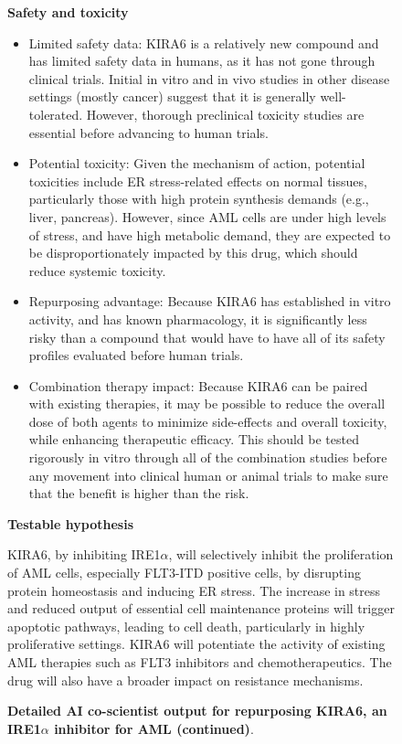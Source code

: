 \begin{figure}[htbp!]
\begin{tcolorbox}[
    colback=black!5!white,
    colframe=black!60!white,
    title=\textbf{KIRA6 for AML (continued)},
    fonttitle=\bfseries,
    arc=3mm,
    boxrule=1pt,
    bottomrule=2pt,
]
\textbf{Safety and toxicity}
\begin{itemize}
    \item Limited safety data: KIRA6 is a relatively new compound and has limited safety data in humans, as it has not gone through clinical trials.  Initial in vitro and in vivo studies in other disease settings (mostly cancer) suggest that it is generally well-tolerated. However, thorough preclinical toxicity studies are essential before advancing to human trials.
    \item Potential toxicity: Given the mechanism of action, potential toxicities include ER stress-related effects on normal tissues, particularly those with high protein synthesis demands (e.g., liver, pancreas). However, since AML cells are under high levels of stress, and have high metabolic demand, they are expected to be disproportionately impacted by this drug, which should reduce systemic toxicity.
    \item Repurposing advantage: Because KIRA6 has established in vitro activity, and has known pharmacology, it is significantly less risky than a compound that would have to have all of its safety profiles evaluated before human trials.
    \item Combination therapy impact: Because KIRA6 can be paired with existing therapies, it may be possible to reduce the overall dose of both agents to minimize side-effects and overall toxicity, while enhancing therapeutic efficacy. This should be tested rigorously in vitro through all of the combination studies before any movement into clinical human or animal trials to make sure that the benefit is higher than the risk.
\end{itemize}

\textbf{Testable hypothesis}

KIRA6, by inhibiting IRE1$\alpha$, will selectively inhibit the proliferation of AML cells, especially FLT3-ITD positive cells, by disrupting protein homeostasis and inducing ER stress. The increase in stress and reduced output of essential cell maintenance proteins will trigger apoptotic pathways, leading to cell death, particularly in highly proliferative settings. KIRA6 will potentiate the activity of existing AML therapies such as FLT3 inhibitors and chemotherapeutics. The drug will also have a broader impact on resistance mechanisms.

\end{tcolorbox}
\vspace{0.1cm}
\caption{\textbf{Detailed AI co-scientist output for repurposing KIRA6, an IRE1$\alpha$ inhibitor for AML (continued)}.}
\label{fig:ex_kira6_4}
\end{figure}


